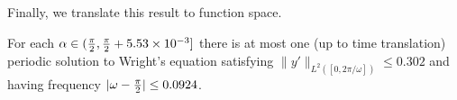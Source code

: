 %
%
%
%
%
%
%
%



Finally, we translate this result to function space.

\begin{theorem}
For each 
$\alpha  \in  (\tfrac{\pi}{2} , \tfrac{\pi}{2} + 5.53 \times 10^{-3} ] $ 
there is at most one (up to time translation) periodic solution to Wright's equation satisfying 
$ \| y' \|_{L^2([0,2\pi/\omega])} \leq  0.302$
	and having frequency 
$ | \omega - \tfrac{\pi}{2} | \leq 0.0924$. 
	\label{thm:UniqunessNbd2}
\end{theorem}

